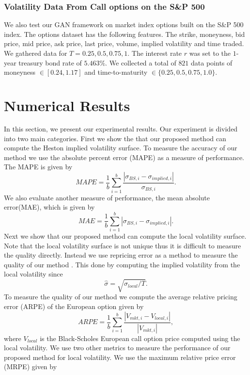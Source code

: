 \documentclass{article}
\theoremstyle{plain}%
\theoremstyle{definition}
\theoremstyle{remark}
\begin{document}
\subsubsection{Volatility Data From Call options on the S\&P 500}
We also test our GAN framework on market index options built on the S\&P 500 index. The options dataset has the following features. The strike, moneyness, bid price, mid price, ask price, last price, volume, implied volatility and time traded. We gathered data for $T = 0.25, 0.5, 0.75, 1$. The interest rate $r$ was set to the $1$-year treasury bond rate of $5.463\%$. We collected a total of $821$ data points of moneyness $\in [0.24,1.17]$ and time-to-maturity $\in \{0.25, 0.5, 0.75, 1.0\}$.

\section{Numerical Results}\label{sec:Results}
In this section, we present our experimental results. Our experiment is divided into two main categories. First we show the that our proposed method can compute the Heston implied volatility surface. To measure the accuracy of our method we use the absolute percent error (MAPE) as a measure of performance. The MAPE is given by
\begin{equation*}
    MAPE = \frac{1}{b} \sum_{i = 1}^b \frac{|\sigma_{BS,i} - \sigma_{implied,i}|}{\sigma_{BS,i}}.
\end{equation*}
We also evaluate another measure of performance, the mean absolute error(MAE), which is given by
\begin{equation*}
    MAE = \frac{1}{b} \sum_{i = 1}^b |\sigma_{BS,i} - \sigma_{implied,i}|.
\end{equation*}Next we show that our proposed method can compute the local volatility surface. Note that the local volatility surface is not unique thus it is difficult to measure the quality directly. Instead we use repricing error as a method to measure the quality of our method \citep{horvath-2021,chataigner-2020,chataigner-2021}. This done by computing the implied volatility from the local volatility since
\[
    \hat{\sigma} = \sqrt{\sigma_{local}/T}.
\]
To measure the quality of our method we compute the average relative pricing error (ARPE) of the European option given by
\begin{equation*}
	ARPE = \frac{1}{b}\sum_{i=1}^{b}\frac{|V_{mkt,i}-V_{local,i}|}{|V_{mkt,i}|},
\end{equation*}
where  $V_{local}$ is the Black-Scholes European call option price computed using the local volatility. We use two other metrics to measure the performance of our proposed method for local volatility. We use the maximum relative price error (MRPE) given by
\end{document}
